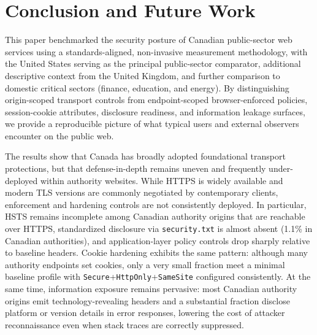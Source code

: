 \documentclass[a4paper,fleqn]{cas-sc}
\begin{document}

\section{Conclusion and Future Work}\label{sec:conclusion_future}

This paper benchmarked the security posture of Canadian public-sector web services using a standards-aligned, non-invasive measurement methodology, with the United States serving as the principal public-sector comparator, additional descriptive context from the United Kingdom, and further comparison to domestic critical sectors (finance, education, and energy).
By distinguishing origin-scoped transport controls from endpoint-scoped browser-enforced policies, session-cookie attributes, disclosure readiness, and information leakage surfaces, we provide a reproducible picture of what typical users and external observers encounter on the public web.

The results show that Canada has broadly adopted foundational transport protections, but that defense-in-depth remains uneven and frequently under-deployed within authority websites. 
While HTTPS is widely available and modern TLS versions are commonly negotiated by contemporary clients, enforcement and hardening controls are not consistently deployed. 
In particular, HSTS remains incomplete among Canadian authority origins that are reachable over HTTPS, standardized disclosure via \texttt{security.txt} is almost absent (1.1\% in Canadian authorities), and application-layer policy controls drop sharply relative to baseline headers. 
Cookie hardening exhibits the same pattern: although many authority endpoints set cookies, only a very small fraction meet a minimal baseline profile with \texttt{Secure}+\texttt{HttpOnly}+\texttt{SameSite} configured consistently. 
At the same time, information exposure remains pervasive: most Canadian authority origins emit technology-revealing headers and a substantial fraction disclose platform or version details in error responses, lowering the cost of attacker reconnaissance even when stack traces are correctly suppressed.
\end{document}

